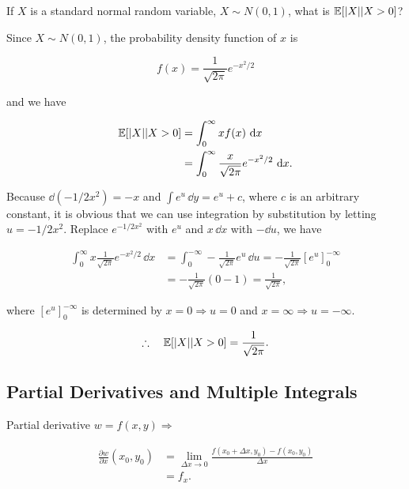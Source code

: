 \begin{problem}{If $X$ is a standard normal random variable, $X\sim N(0,1)$, what is $\mathbb{E}[\lvert X\rvert\vert X>0]$?}
\end{problem}

\begin{solution}
Since $X\sim N(0,1)$, the probability density function of $x$ is

\[
  f(x)=\frac{1}{\sqrt{2\pi}}e^{-x^2/2}
\]

and we have

\[
  \begin{aligned}
  \mathbb{E}[\lvert X\rvert\vert X>0]
  &=\int_{0}^{\infty}xf(x)\,\mathop{}\!\mathrm{d} x\\
  &=\int_{0}^{\infty}\frac{x}{\sqrt{2\pi}}e^{-x^2/2}\,\mathop{}\!\mathrm{d} x.
  \end{aligned}
\]

Because $\dd(-1/2x^2)=-x$ and $\int e^u\,\dd y=e^u+c$, where $c$ is an arbitrary constant,
it is obvious that we can use integration by substitution by letting $u=-1/2x^2$. Replace
$e^{-1/2x^2}$ with $e^u$ and $x\,\dd x$ with $-\dd u$, we have

\[
\begin{aligned}
  \int_{0}^{\infty}x\frac{1}{\sqrt{2\pi}}e^{-x^2/2}\,\dd x
  &=\int_{0}^{-\infty}-\frac{1}{\sqrt{2\pi}}e^u\,\dd u
   =-\frac{1}{\sqrt{2\pi}}\left[e^u\right]_{0}^{-\infty} \\
  &=-\frac{1}{\sqrt{2\pi}}(0-1)=\frac{1}{\sqrt{2\pi}},
\end{aligned}
\]

where $[e^u]_{0}^{-\infty}$ is determined by $x=0\Rightarrow u=0$ and
$x=\infty\Rightarrow u=-\infty$.

\[
  \therefore\quad \mathbb{E}[\lvert X\rvert\vert X>0]=\frac{1}{\sqrt{2\pi}}.
\]
\end{solution}

\subsection{Partial Derivatives and Multiple Integrals}

\begin{concept}{Partial derivative}
$w=f(x,y)\Rightarrow$

\[
  \begin{aligned}
  \frac{\partial w}{\partial x}(x_0,y_0)
  &=\lim_{\Delta x\to0}\frac{f(x_0+\Delta x,y_0)-f(x_0,y_0)}{\Delta x}\\
  &=f_x.
  \end{aligned}
\]
\end{concept}

